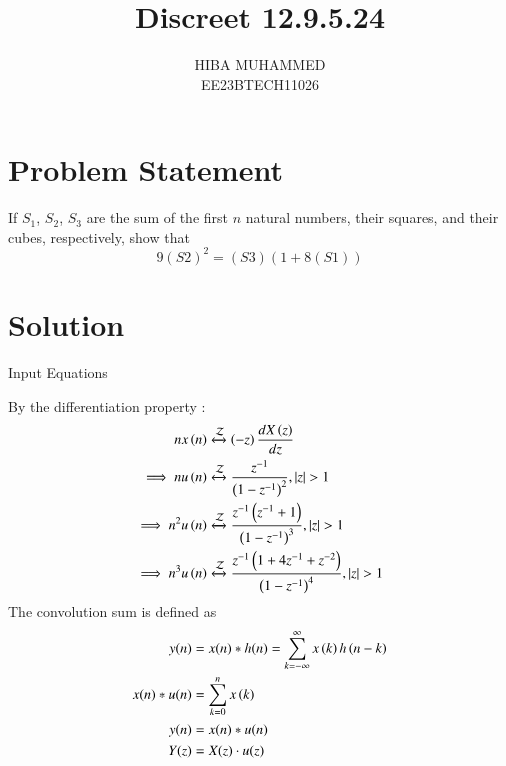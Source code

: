 \documentclass[journal,12pt,onecolumn]{IEEEtran}
\theoremstyle{remark}
\begin{document}
\let\vec\mathbf



\title{Discreet 12.9.5.24}
\author{HIBA MUHAMMED\\
        EE23BTECH11026}
\maketitle

\section*{Problem Statement}
If \(S_1\), \(S_2\), \(S_3\) are the sum of the first \(n\) natural numbers, their squares, and their cubes, respectively, show that 
\[ 9(S\scriptstyle 2)^2 = (S\scriptstyle 3)(1 + 8(S\scriptstyle 1)) \]

\section*{Solution}
\begin{table}[h]
  \centering
  
  \caption{Input Equations}
  \label{tab:input-equations}
  
\end{table}
 By the differentiation property :
    \begin{align}
     n x\left(n\right) &\xleftrightarrow{\mathcal{Z}} \left(-z\right) \frac{dX\left(z\right)}{dz} \\
    \implies    n u\left(n\right) &\xleftrightarrow{\mathcal{Z}} \frac{z^{-1}}{\left(1-z^{-1}\right)^2} ,   \left\vert z\right\vert >1 \\
    \implies     n^2 u\left(n\right) &\xleftrightarrow{\mathcal{Z}} \frac{z^{-1}\left(z^{-1}+1\right)}{\left(1-z^{-1}\right)^3} ,  \left\vert z\right\vert > 1\\
    \implies     n^3 u\left(n\right) &\xleftrightarrow{\mathcal{Z}} \frac{z^{-1}\left(1+4z^{-1}+z^{-2}\right)}{\left(1-z^{-1}\right)^4} ,   \left\vert z\right\vert >1 
    \end{align}
    The convolution sum is defined as
\begin{align}
      y(n) &= x(n)* h(n) = \sum_{k=-\infty}^{\infty}x\left(k\right)h\left(n-k\right)\\
      x(n)*u(n)  &= \sum_{k=0}^{n}x\left(k\right)\\
      y(n) &= x(n) * u(n) \\
      Y(z) &= X(z) \cdot u(z) 
\end{align}
    
\end{document}
